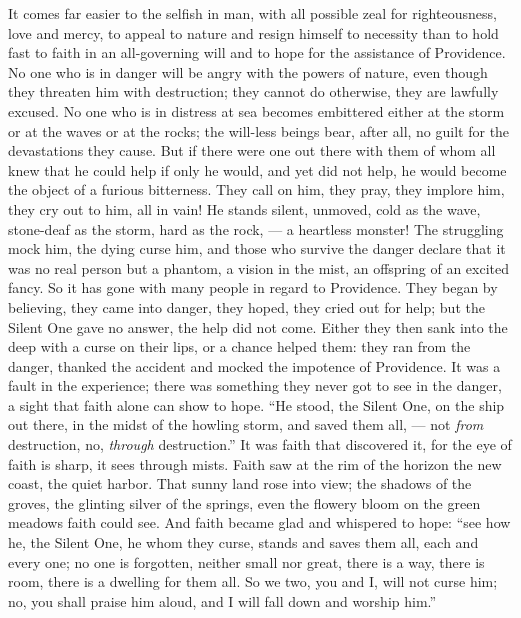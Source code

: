 \documentclass[12pt,a4paper,openany]{book}
\newcommand{\opage}[1]{\marginnote{\footnotesize\textit{[#1]}}}
\begin{document}
It comes far easier to the selfish in man, with all possible zeal for righteousness, love and mercy, to appeal to
nature and resign himself to necessity than to hold fast to faith in an all-governing will and to hope for the
assistance of Providence. No one who is in danger will be angry with the powers of nature, even though they threaten
him with destruction; they cannot do otherwise, they are lawfully excused. No one who is in distress at sea becomes
embittered either at the storm or at the waves or at the rocks; the will-less beings bear, after all, no guilt for the
devastations they cause. But if there were one out there with them of whom all knew that he could help if only he
would, and yet did not help, he would become the object of a furious bitterness. They call on him, they pray, they
implore him, they cry out to him, all in vain! He stands silent, unmoved, cold as the wave, stone-deaf as the storm,
hard as the rock, --- a heartless monster! The struggling mock him, the dying curse him, and those who survive the
danger declare that it was no real person but a phantom, a vision in the mist, an offspring of an excited fancy. So it
has gone with many people in regard to Providence. They began by believing, they came into danger, they hoped, they
cried out for help; but the Silent One gave no answer, the help did not come. Either they then sank into the deep with
a curse on their lips, or a chance helped them: they ran from the danger, thanked the accident and mocked the
impotence of Providence. It was a fault in the experience; there was
something they never got to see in the danger, a sight that faith
\setcounter{footnote}{0}%
\opage{59}alone can show to hope. ``He stood, the Silent One, on the ship out there, in the midst of the howling storm,
and saved them all, --- not \emph{from} destruction, no, \emph{through} destruction.'' It was faith that discovered it,
for the eye of faith is sharp, it sees through mists. Faith saw at the rim of the horizon the new coast, the quiet
harbor. That sunny land rose into view; the shadows of the groves, the glinting silver of the springs, even the
flowery bloom on the green meadows faith could see. And faith became glad and whispered to hope: ``see how he, the
Silent One, he whom they curse, stands and saves them all, each and every one; no one is forgotten, neither small nor
great, there is a way, there is room, there is a dwelling for them all. So we two, you and I, will not curse him; no,
you shall praise him aloud, and I will fall down and worship him.''
\end{document}
